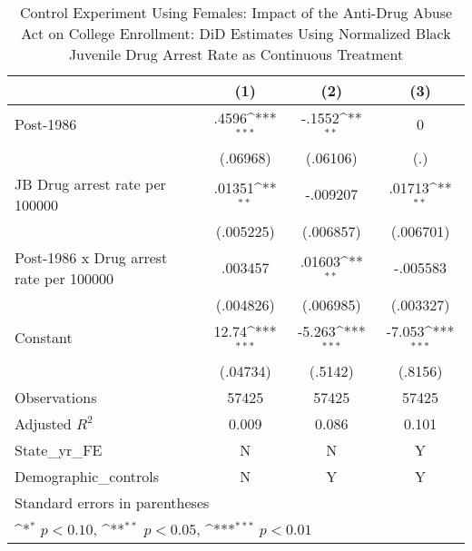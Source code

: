 \begin{table}[htbp]\centering
\def\sym#1{\ifmmode^{#1}\else\(^{#1}\)\fi}
\caption{Control Experiment Using Females: Impact of the Anti-Drug Abuse Act on College Enrollment: DiD Estimates Using Normalized Black Juvenile Drug Arrest Rate as Continuous Treatment}
\begin{tabular}{l*{3}{c}}
\hline\hline
                    &\multicolumn{1}{c}{(1)}         &\multicolumn{1}{c}{(2)}         &\multicolumn{1}{c}{(3)}         \\
\hline
Post-1986           &       .4596\sym{***}&      -.1552\sym{**} &           0         \\
                    &    (.06968)         &    (.06106)         &         (.)         \\
[1em]
JB Drug arrest rate per 100000&      .01351\sym{**} &    -.009207         &      .01713\sym{**} \\
                    &   (.005225)         &   (.006857)         &   (.006701)         \\
[1em]
Post-1986 x Drug arrest rate per 100000&     .003457         &      .01603\sym{**} &    -.005583         \\
                    &   (.004826)         &   (.006985)         &   (.003327)         \\
[1em]
Constant            &       12.74\sym{***}&      -5.263\sym{***}&      -7.053\sym{***}\\
                    &    (.04734)         &     (.5142)         &     (.8156)         \\
\hline
Observations        &       57425         &       57425         &       57425         \\
Adjusted \(R^{2}\)  &       0.009         &       0.086         &       0.101         \\
State\_yr\_FE         &           N         &           N         &           Y         \\
Demographic\_controls&           N         &           Y         &           Y         \\
\hline\hline
\multicolumn{4}{l}{\footnotesize Standard errors in parentheses}\\
\multicolumn{4}{l}{\footnotesize \sym{*} \(p<0.10\), \sym{**} \(p<0.05\), \sym{***} \(p<0.01\)}\\
\end{tabular}
\end{table}
